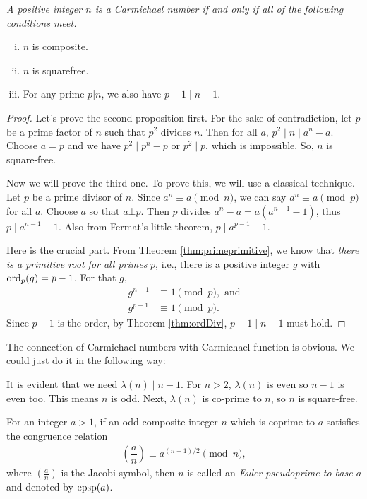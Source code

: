 \documentclass{subfile}
\begin{document}
	\begin{theorem}\slshape
		A positive integer $n$ is a Carmichael number if and only if all of the following conditions meet.
		\begin{enumerate}[i.]
			\item $n$ is composite.
			\item $n$ is squarefree.
			\item For any prime $p|n$, we also have $p-1 \mid n-1$.
		\end{enumerate}
	\end{theorem}
	
	\begin{proof}
		Let's prove the second proposition first. For the sake of contradiction, let $p$ be a prime factor of $n$ such that $p^2$ divides $n$. Then for all $a$, $p^2 \mid n \mid a^n-a$. Choose $a=p$ and we have $p^2 \mid p^n-p$ or $p^2 \mid p$, which is impossible. So, $n$ is square-free.
		
		Now we will prove the third one. To prove this, we will use a classical technique. Let $p$ be a prime divisor of $n$. Since $a^n\equiv a\pmod n$, we can say $a^n\equiv a\pmod p$ for all $a$. Choose $a$ so that $a\bot p$. Then $p$ divides $a^n-a=a(a^{n-1}-1)$, thus $p \mid a^{n-1}-1$. Also from Fermat's little theorem, $p \mid a^{p-1}-1$.
		
		Here is the crucial part. From Theorem \ref{thm:primeprimitive}, we know that \textit{there is a primitive root for all primes} $p$, i.e., there is a positive integer $g$ with $\operatorname{ord}_p(g)=p-1$. For that $g$,
		\begin{align*}
		g^{n-1} & \equiv1\pmod p,\text { and}\\
		g^{p-1} & \equiv1\pmod p.
		\end{align*}
		Since $p-1$ is the order, by Theorem \ref{thm:ordDiv}, $p-1 \mid n-1$ must hold.
	\end{proof}
	
	\begin{note}
		The connection of Carmichael numbers with Carmichael function is obvious. We could just do it in the following way:
		
		It is evident that we need $\lambda(n)\mid n-1$. For $n>2$, $\lambda(n)$ is even so $n-1$ is even too. This means $n$ is odd. Next, $\lambda(n)$ is co-prime to $n$, so $n$ is square-free.
	\end{note}
	
	\begin{definition}\label{def:eulerpseudoprime}
		For an integer $a>1$, if an odd composite integer $n$ which is coprime to $a$ satisfies the congruence relation
			\begin{align*}
				\left(\dfrac{a}{n}\right) \equiv a^{(n-1)/2} \pmod n,
			\end{align*} 
		where $\left(\frac{a}{n}\right)$ is the Jacobi symbol, then $n$ is called an \textit{Euler pseudoprime to base $a$} and denoted by $\operatorname{epsp}(a)$.
	\end{definition}
	
\end{document}
